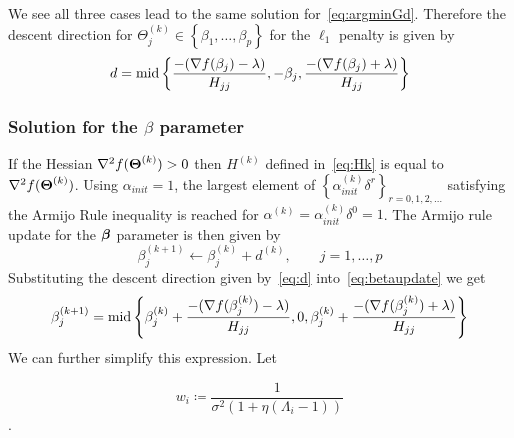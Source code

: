 We see all three cases lead to the same solution for~\eqref{eq:argminGd}. Therefore the descent direction for $\Theta_j^{(k)} \in \left\lbrace \beta_1, \ldots, \beta_p \right\rbrace$ for the $\ell_1$ penalty is given by
\begin{equation}
d = \textrm{{mid}}\left\lbrace \frac{-(\nabla f(\beta_{j}) - \lambda)}{H_{j j}}, -\beta_j ,\frac{-(\nabla f(\beta_{j}) + \lambda)}{H_{j j}} \right\rbrace  \label{eq:d}
\end{equation}

\subsubsection{Solution for the $\beta$ parameter} \label{ap:beta}
If the Hessian $\nabla^2f(\boldsymbol{\Theta}^{(k)}) >0$ then $H^{(k)}$ defined in~\eqref{eq:Hk} is equal to $\nabla^2f(\boldsymbol{\Theta}^{(k)})$. Using $\alpha_{init} = 1$, the largest element of $\left\lbrace \alpha_{init}^{(k)} \delta^r \right\rbrace_{r = 0, 1, 2, \ldots}$ satisfying the Armijo Rule inequality is reached for $\alpha^{(k)} = \alpha_{init}^{(k)}\delta^0 = 1$. The Armijo rule update for the $\boldsymbol{\beta}$ parameter is then given by
\begin{equation}
\beta_j^{(k+1)} \leftarrow \beta_j^{(k)} + d^{(k)}, \qquad j=1, \ldots, p \label{eq:betaupdate}
\end{equation}
Substituting the descent direction given by~\eqref{eq:d} into~\eqref{eq:betaupdate} we get
\begin{equation}
\beta_j^{(k+1)} = \textrm{{mid}}\left\lbrace \beta_j^{(k)}+ \frac{-(\nabla f(\beta_j^{(k)}) - \lambda)}{H_{j j}}, 0,\beta_j^{(k)}+ \frac{-(\nabla f(\beta_j^{(k)}) + \lambda)}{H_{j j}}  \right\rbrace \label{eq:betaMidpoint}
\end{equation}
We can further simplify this expression. Let %

\begin{equation}
w_i \coloneqq \frac{1}{\sigma^2\left(1+\eta(\Lambda_i-1)\right)}
\end{equation}.


